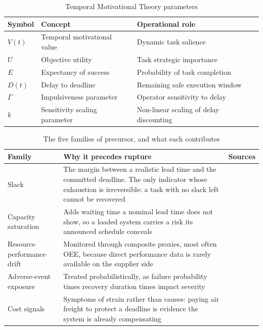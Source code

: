\begin{table}[htbp]
\centering
\caption{Temporal Motivational Theory parameters}
\label{tab:tmt_vars}
\begin{tabularx}{\linewidth}{llX}
\toprule
\textbf{Symbol} & \textbf{Concept} & \textbf{Operational role} \\
\midrule
$V(t)$ & Temporal motivational value & Dynamic task salience \\
$U$ & Objective utility & Task strategic importance \\
$E$ & Expectancy of success & Probability of task completion \\
$D(t)$ & Delay to deadline & Remaining safe execution window \\
$\Gamma$ & Impulsiveness parameter & Operator sensitivity to delay \\
$k$ & Sensitivity scaling parameter & Non-linear scaling of delay discounting \\
\bottomrule
\end{tabularx}
\end{table}

\begin{table}[htbp]
\centering
\caption[Precursors of delivery rupture]{The five families of precursor, and what each
contributes}
\label{tab:precursors}
\small
\begin{tabularx}{\linewidth}{@{}>{\raggedright\arraybackslash}p{2.5cm} X
                                 >{\raggedright\arraybackslash}p{3.3cm}@{}}
\toprule
\textbf{Family} & \textbf{Why it precedes rupture} & \textbf{Sources} \\
\midrule
Slack & The margin between a realistic lead time and the committed deadline. The only
indicator whose exhaustion is irreversible: a task with no slack left cannot be recovered
& \autocite{cohen2021assigning,bojarski2021,sun2020combating,sawik2013integrated} \\
\addlinespace
Capacity saturation & Adds waiting time a nominal lead time does not show, so a loaded system
carries a risk its announced schedule conceals
& \autocite{tomlin2006value,hosseini2019resilient,taghavi2024sustainable} \\
\addlinespace
Resource performance drift & Monitored through composite proxies, most often OEE, because
direct performance data is rarely available on the supplier side
& \autocite{mokhtar2019supplier,hlioui2017joint} \\
\addlinespace
Adverse-event exposure & Treated probabilistically, as failure probability times recovery
duration times impact severity
& \autocite{hosseini2020ripple,liu2021robust,hosseini2020bayesian} \\
\addlinespace
Cost signals & Symptoms of strain rather than causes: paying air freight to protect a deadline
is evidence the system is already compensating
& \autocite{heckmann2015critical,mokhtar2019supplier} \\
\bottomrule
\end{tabularx}
\end{table}

